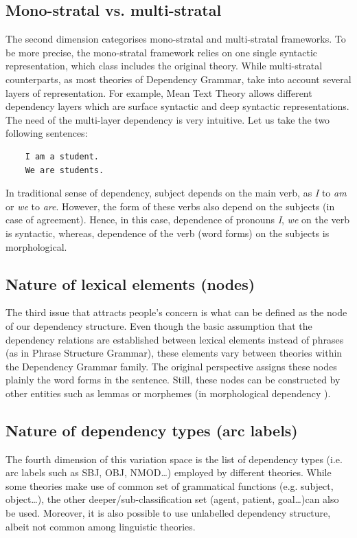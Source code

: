 \documentclass[12pt]{article}
\begin{document}
\subsection{Mono-stratal vs. multi-stratal}
The second dimension categorises mono-stratal and multi-stratal frameworks. To be more precise, the mono-stratal framework relies on one single syntactic representation, which class includes the original theory. While multi-stratal counterparts, as most theories of Dependency Grammar, take into account several layers of representation. For example, Mean Text Theory \cite{melʹvcuk1988dependency} allows different dependency layers which are surface syntactic and deep syntactic representations. The need of the multi-layer dependency is very intuitive. Let us take the two following sentences:
\begin{verbatim}
	I am a student.
	We are students.
\end{verbatim}
In traditional sense of dependency, subject depends on the main verb, as \textit{I} to \textit{am} or \textit{we} to \textit{are}. However, the form of these verbs also depend on the subjects (in case of agreement). Hence, in this case, dependence of pronouns \textit{I}, \textit{we} on the verb is syntactic, whereas, dependence of the verb (word forms) on the subjects is morphological.

\subsection{Nature of lexical elements (nodes)}
The third issue that attracts people's concern is what can be defined as the node of our dependency structure. Even though the basic assumption that the dependency relations are established between lexical elements instead of phrases (as in Phrase Structure Grammar), these elements vary between theories within the Dependency Grammar family. The original perspective assigns these nodes plainly the word forms in the sentence. Still, these nodes can be constructed by other entities such as lemmas or morphemes (in morphological dependency \cite{melʹvcuk1988dependency}).

\subsection{Nature of dependency types (arc labels)}
The fourth dimension of this variation space is the list of dependency types (i.e. arc labels such as SBJ, OBJ, NMOD\dots) employed by different theories. While some theories make use of common set of grammatical functions (e.g. subject, object\dots), the other deeper/sub-classification set (agent, patient, goal\dots)can also be used. Moreover, it is also possible to use unlabelled dependency structure, albeit not common among linguistic theories.
\end{document}
